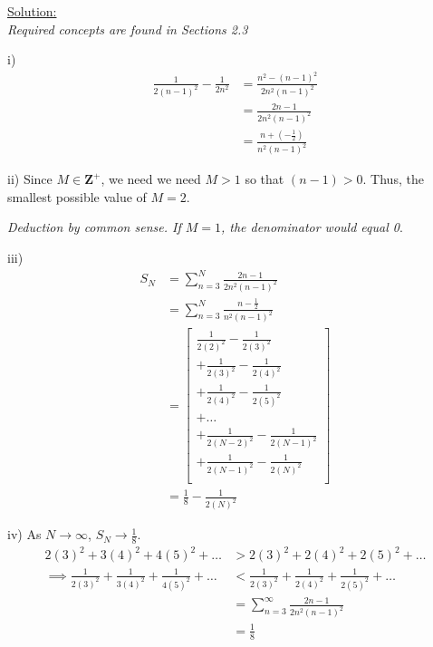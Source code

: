 \documentclass[12pt, a4paper, titlepage]{article}
\begin{document}
\begin{flushright}
\end{flushright}

\underline{Solution:} \\
\emph{Required concepts are found in Sections 2.3}

i)
\begin{align*}
    \frac{1}{2(n - 1)^2} - \frac{1}{2n^2} &= \frac{n^2 - (n - 1)^2}{2n^2(n - 1)^2} \\
    &= \frac{2n - 1}{2n^2(n - 1)^2} \\
    &= \frac{n + (-\frac{1}{2})}{n^2(n - 1)^2}
\end{align*}

ii)
Since $M \in \mathbf{Z}^{+}$, we need we need $M > 1$ so that $(n - 1) > 0$. Thus, the smallest possible value of $M = 2$.

\emph{Deduction by common sense. If $M = 1$, the denominator would equal 0}.

iii)
\begin{align*}
    S_N &= \sum^N_{n = 3} \frac{2n - 1}{2n^2(n - 1)^2} \\
    &= \sum^N_{n = 3} \frac{n - \frac{1}{2}}{n^2(n - 1)^2} \\
    &= \left[
    \begin{array}{c}
        \frac{1}{2(2)^2} - \frac{1}{2(3)^2} \\
        + \frac{1}{2(3)^2} - \frac{1}{2(4)^2} \\
        + \frac{1}{2(4)^2} - \frac{1}{2(5)^2} \\
        + \dots \\
        + \frac{1}{2(N - 2)^2} - \frac{1}{2(N - 1)^2} \\
        + \frac{1}{2(N - 1)^2} - \frac{1}{2(N)^2} \\
    \end{array}
    \right] \\
    &= \frac{1}{8} - \frac{1}{2(N)^2}
\end{align*}

iv)
As $N \rightarrow \infty$, $S_N \rightarrow \frac{1}{8}$.
\begin{align*}
    2(3)^2 + 3(4)^2 + 4(5)^2 + \dots &> 2(3)^2 + 2(4)^2 + 2(5)^2 + \dots \\
    \implies \frac{1}{2(3)^2} + \frac{1}{3(4)^2} + \frac{1}{4(5)^2} + \dots &< \frac{1}{2(3)^2} + \frac{1}{2(4)^2} + \frac{1}{2(5)^2} + \dots \\
    &= \sum^\infty_{n = 3} \frac{2n - 1}{2n^2(n - 1)^2} \\
    &= \frac{1}{8}
\end{align*}
\end{document}
